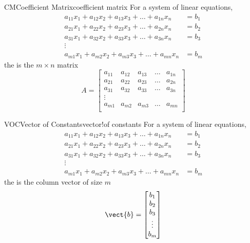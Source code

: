 \begin{definition}{CM}{Coefficient Matrix}{coefficient matrix}
For a system of linear equations,
\begin{align*}
a_{11}x_1+a_{12}x_2+a_{13}x_3+\dots+a_{1n}x_n&=b_1\\
a_{21}x_1+a_{22}x_2+a_{23}x_3+\dots+a_{2n}x_n&=b_2\\
a_{31}x_1+a_{32}x_2+a_{33}x_3+\dots+a_{3n}x_n&=b_3\\
\vdots&\\
a_{m1}x_1+a_{m2}x_2+a_{m3}x_3+\dots+a_{mn}x_n&=b_m
\end{align*}
the  is the $m\times n$ matrix
\begin{equation*}
A=
\begin{bmatrix}
a_{11}&a_{12}&a_{13}&\dots&a_{1n}\\
a_{21}&a_{22}&a_{23}&\dots&a_{2n}\\
a_{31}&a_{32}&a_{33}&\dots&a_{3n}\\
\vdots&\\
a_{m1}&a_{m2}&a_{m3}&\dots&a_{mn}\\
\end{bmatrix}
\end{equation*}
\end{definition}
%
\begin{definition}{VOC}{Vector of Constants}{vector!of constants}
For a system of linear equations,
\begin{align*}
a_{11}x_1+a_{12}x_2+a_{13}x_3+\dots+a_{1n}x_n&=b_1\\
a_{21}x_1+a_{22}x_2+a_{23}x_3+\dots+a_{2n}x_n&=b_2\\
a_{31}x_1+a_{32}x_2+a_{33}x_3+\dots+a_{3n}x_n&=b_3\\
\vdots&\\
a_{m1}x_1+a_{m2}x_2+a_{m3}x_3+\dots+a_{mn}x_n&=b_m
\end{align*}
the  is the column vector of size $m$
\begin{equation*}
\vect{b}=
\begin{bmatrix}
b_1\\
b_2\\
b_3\\
\vdots\\
b_m\\
\end{bmatrix}
\end{equation*}
\end{definition}
%
